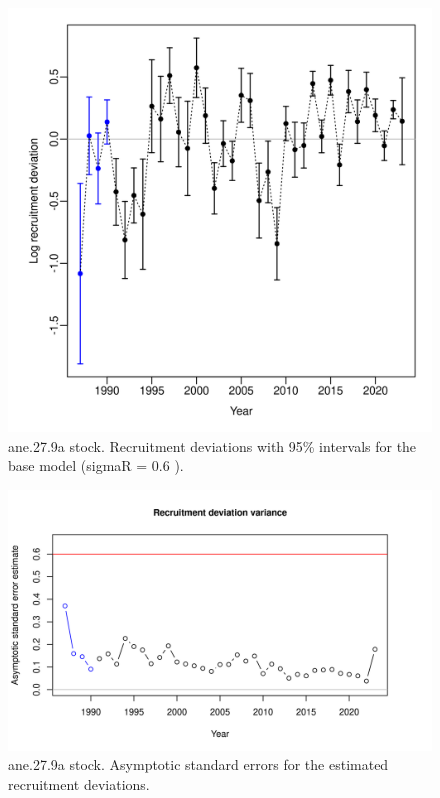 \documentclass[
]{article}
\begin{document}
\begin{figure}[H]

{\centering \includegraphics[width=0.95\linewidth]{report/run/S1.0_4FLEETS/fig_Recdevs} 

}

\caption{ane.27.9a stock. Recruitment deviations with 95\% intervals for the base model (sigmaR = 0.6 ).}\label{fig:unnamed-chunk-32}
\end{figure}

\begin{figure}[H]

{\centering \includegraphics[width=0.95\linewidth]{report/run/S1.0_4FLEETS/fig_recdevs2_varcheck} 

}

\caption{ane.27.9a stock. Asymptotic standard errors for the estimated recruitment deviations.}\label{fig:unnamed-chunk-33}
\end{figure}
\end{document}
